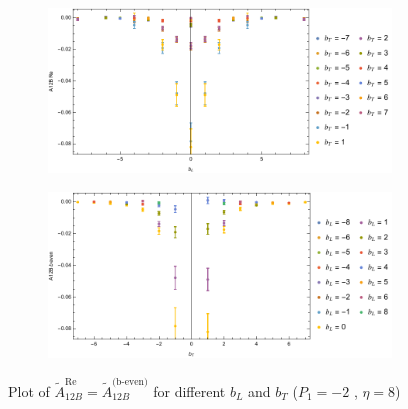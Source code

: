\documentclass[]{article}
\numberwithin{equation}{section}
\newcommand{\tAmp}{\widetilde{A}}
\newcommand{\tAmp}{\ensuremath{\widetilde{A}^{(+)}}}
\begin{document}
\begin{figure}[h!]
     \centering
     \begin{subfigure}[b]{0.45\textwidth}
         \centering
         \includegraphics[width=\textwidth]{Amp_plots/bL_A12B_b_even_P1_-2_eta_8.pdf}
     \end{subfigure}
     \begin{subfigure}[b]{0.45\textwidth}
         \centering
         \includegraphics[width=\textwidth]{Amp_plots/bT_A12B_b_even_P1_-2_eta_8.pdf}
     \end{subfigure}
        \caption{Plot of  $\tAmp^{\text{Re}}_{12B}=\tAmp^{\text{(b-even)}}_{12B}$ for different $b_{L}$ and $b_{T}$  ($P_{1} = -2$ , $\eta=8$)}
\end{figure}
\end{document}
